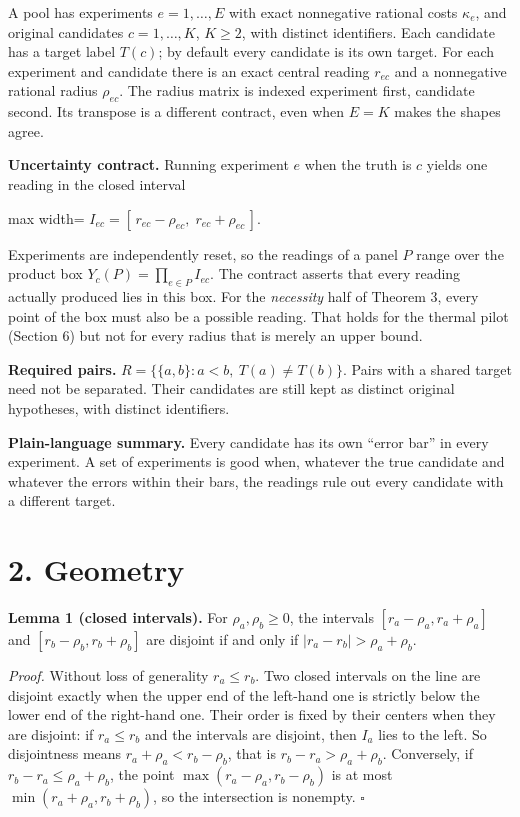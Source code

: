 \documentclass[
  11pt,
  a4paper,
]{report}
\begin{document}
A pool has experiments \(e=1,\dots,E\) with exact nonnegative rational
costs \(\kappa_e\), and original candidates \(c=1,\dots,K\), \(K\ge2\),
with distinct identifiers. Each candidate has a target label \(T(c)\);
by default every candidate is its own target. For each experiment and
candidate there is an exact central reading \(r_{ec}\) and a nonnegative
rational radius \(\rho_{ec}\). The radius matrix is indexed experiment
first, candidate second. Its transpose is a different contract, even
when \(E=K\) makes the shapes agree.

\textbf{Uncertainty contract.} Running experiment \(e\) when the truth
is \(c\) yields one reading in the closed interval

\begin{center}
\begin{adjustbox}{max width=\linewidth}
$\displaystyle
I_{ec}=[\,r_{ec}-\rho_{ec},\;r_{ec}+\rho_{ec}\,].
$
\end{adjustbox}
\end{center}

Experiments are independently reset, so the readings of a panel \(P\)
range over the product box \(Y_c(P)=\prod_{e\in P}I_{ec}\). The contract
asserts that every reading actually produced lies in this box. For the
\emph{necessity} half of Theorem 3, every point of the box must also be
a possible reading. That holds for the thermal pilot (Section 6) but not
for every radius that is merely an upper bound.

\textbf{Required pairs.} \(R=\{\{a,b\}: a<b,\ T(a)\ne T(b)\}\). Pairs
with a shared target need not be separated. Their candidates are still
kept as distinct original hypotheses, with distinct identifiers.

\textbf{Plain-language summary.} Every candidate has its own ``error
bar'' in every experiment. A set of experiments is good when, whatever
the true candidate and whatever the errors within their bars, the
readings rule out every candidate with a different target.

\hypertarget{geometry}{%
\section{2. Geometry}\label{geometry}}

\textbf{Lemma 1 (closed intervals).} For \(\rho_a,\rho_b\ge0\), the
intervals \([r_a-\rho_a,r_a+\rho_a]\) and \([r_b-\rho_b,r_b+\rho_b]\)
are disjoint if and only if \(|r_a-r_b|>\rho_a+\rho_b\).

\emph{Proof.} Without loss of generality \(r_a\le r_b\). Two closed
intervals on the line are disjoint exactly when the upper end of the
left-hand one is strictly below the lower end of the right-hand one.
Their order is fixed by their centers when they are disjoint: if
\(r_a\le r_b\) and the intervals are disjoint, then \(I_a\) lies to the
left. So disjointness means \(r_a+\rho_a<r_b-\rho_b\), that is
\(r_b-r_a>\rho_a+\rho_b\). Conversely, if \(r_b-r_a\le\rho_a+\rho_b\),
the point \(\max(r_a-\rho_a,r_b-\rho_b)\) is at most
\(\min(r_a+\rho_a,r_b+\rho_b)\), so the intersection is nonempty.
\(\square\)
\end{document}
